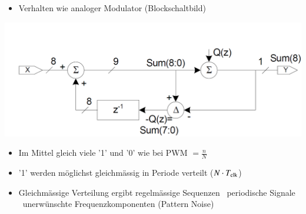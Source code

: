 \begin{minipage}[c]{0.48\columnwidth}
    \begin{itemize}
        \item Verhalten wie analoger Modulator (Blockschaltbild)
    \end{itemize}

    \includegraphics[width=\columnwidth]{images/sigma-delta-DAC_blockschaltbild.png}
\end{minipage}
\hfill
\begin{minipage}[c]{0.48\columnwidth}
    \begin{itemize}
        \item Im Mittel gleich viele '1' und '0' wie bei PWM $= \frac{n}{N}$
        \item '1' werden möglichst gleichmässig in Periode verteilt ($N \cdot T_{\rm clk}$)
        \item Gleichmässige Verteilung ergibt regelmässige Sequenzen \textrightarrow\ periodische Signale \textrightarrow\ unerwünschte
            Frequenzkomponenten (Pattern Noise)
    \end{itemize}
\end{minipage}

